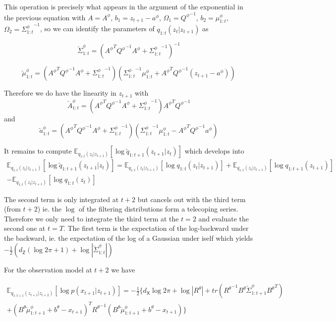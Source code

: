 \documentclass{article}
\newcommand{\1}{\mathbbm{1}}
\newcommand{\expect}[2]{\mathbb{E}_{#1}\left[#2\right]}
\newcommand{\backward}[1]{\overleftarrow{#1}}
\newcommand{\vbackward}[1]{q_{1:#1}(z_{#1}|z_{#1 + 1})}
\newcommand{\vfilt}[1]{q_{1:#1}(z_{#1})}
\newcommand{\vbackwardparam}[2]{\backward{#1}_{1:#2}^\phi}
\newcommand{\vbackwardmean}[1]{\vbackwardparam{\mu}{#1}}
\newcommand{\vbackwardcov}[1]{\vbackwardparam{\Sigma}{#1}}
\newcommand{\vfiltparam}[2]{#1_{1:#2}^\phi}
\newcommand{\vfiltmean}[1]{\vfiltparam{\mu}{#1}}
\newcommand{\vfiltcov}[1]{\vfiltparam{\Sigma}{#1}}
\newcommand{\inv}[1]{{#1}^{-1}}
\newcommand{\vstateprec}{\inv{Q^\phi}}
\newcommand{\quadform}[2]{#1^T #2 #1}
\begin{document}
This operation is precisely what appears in the argument of the exponential in the previous equation with $A = A^\phi$, $b_1 = z_{t+1} - a^\phi$, $\Omega_1 = \vstateprec$, $b_2 = \vfiltmean{t}$, $\Omega_2 = \inv{\vfiltcov{t}}$, so we can identify the parameters of $\vbackward{t}$ as 

$$\vbackwardcov{t} = \inv{\left(\quadform{{A^\phi}}{\vstateprec} + \inv{\vfiltcov{t}}\right)}$$

$$\vbackwardmean{t} = \left(\quadform{{A^\phi}}{\vstateprec} + \inv{\vfiltcov{t}}\right)\left(\inv{\vfiltcov{t}}\vfiltmean{t} + {A^\phi}^T \vstateprec (z_{t+1} - a^\phi)\right)$$

Therefore we do have the linearity in $z_{t+1}$ with $$\backward{A}_{1:t}^\phi = \left(\quadform{{A^\phi}}{\vstateprec} + \inv{\vfiltcov{t}}\right) {A^\phi}^T \vstateprec$$ and $$\backward{a}_{1:t}^\phi = \left(\quadform{{A^\phi}}{\vstateprec} + \inv{\vfiltcov{t}}\right)\left(\inv{\vfiltcov{t}}\vfiltmean{t} - {A^\phi}^T \vstateprec a^\phi \right)$$


It remains to compute $\expect{\vbackward{t}}{\log \tilde{q}_{1:t+1}(z_{t+1}|z_t)}$ which develops into
\begin{multline*}
    \expect{\vbackward{t}}{\log \tilde{q}_{1:t+1}(z_{t+1}|z_t)}= \expect{\vbackward{t}}{\log \vbackward{t}} + \expect{\vbackward{t}}{\log \vfilt{t+1}} \\ 
    - \expect{\vbackward{t}}{\log \vfilt{t}}
\end{multline*}

The second term is only integrated at $t+2$ but cancels out with the third term (from $t+2$) ie. the $\log$ of the filtering distributions form a telecoping series. Therefore we only need to integrate the third term at the $t=2$ and evaluate the second one at $t=T$. The first term is the expectation of the log-backward under the backward, ie. the expectation of the log of a Gaussian under iself which yields $-\frac{1}{2}\left(d_{\mathsf{Z}}(\log 2\pi + 1) + \log |\vbackwardcov{t}|\right)$

For the observation model at $t+2$ we have

\begin{multline*}
\expect{q_{1:t+1}(z_{t+1}|z_{t+2})}{\log p(x_{t+1}|z_{t+1})} = -\frac{1}{2}\{d_{\mathsf{X}}\log 2\pi + \log |R^\theta| + tr\left(\inv{R^\theta} B^\theta\vbackwardcov{t+1}{B^\theta}^T\right) \\ + \quadform{(B^\theta\vbackwardmean{t+1} + b^\theta - x_{t+1})}{\inv{R^\theta}}\}
\end{multline*} 
\end{document}
